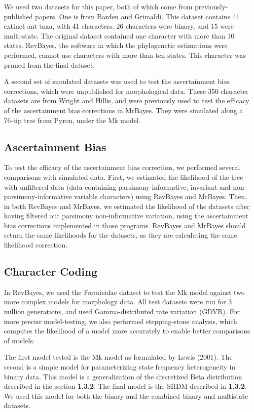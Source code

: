 \documentclass[]{article}
\begin{document}
We used two datasets for this paper, both of which come from previously-published papers.
One is from Barden and Grimaldi.
This dataset contains 41 extinct ant taxa, with 41 characters.
26 characters were binary, and 15 were multi-state.
The original dataset contained one character with more than 10 states.
RevBayes, the software in which the phylogenetic estimations were performed, cannot use characters with more than ten states.
This character was pruned from the final dataset. \par
A second set of simulated datasets was used to test the ascertainment bias corrections, which were unpublished for morphological data.
These 350-character datasets are from Wright and Hillis, and were previously used to test the efficacy of the ascertainment bias corrections in MrBayes. 
They were simulated along a 76-tip tree from Pyron, under the Mk model. \par

\subsection{Ascertainment Bias}

To test the efficacy of the ascertainment bias correction, we performed several comparisons with simulated data.
First, we estimated the likelihood of the tree with unfiltered data (data containing parsimony-informative, invariant and non-parsimony-informative variable characters) using RevBayes and MrBayes.
Then, in both RevBayes and MrBayes, we estimated the likelihood of the datasets after having filtered out parsimony non-informative variation, using the ascertainment bias corrections implemented in those programs.
RevBayes and MrBayes should return the same likelihoods for the datasets, as they are calculating the same likelihood correction. \par


\subsection{Character Coding}

In RevBayes, we used the Formicidae dataset to test the Mk model against two more complex models for morphology data. 
All test datasets were run for 3 million generations, and used Gamma-distributed rate variation (GDVR). 
For more precise model-testing, we also performed stepping-stone analysis, which computes the likelihood of a model more accurately to enable better comparisons of models. \par
The first model tested is the Mk model as formulated by Lewis (2001).
The second is a simple model for parameterizing state frequency heterogeneity in binary data. 
This model is a generalization of the discretized Beta distribution described in the section \textbf{1.3.2}. 
The final model is the SHDM described in \textbf{1.3.2}. 
We used this model for both the binary and the combined binary and multistate datasets. 
\par
\end{document}
